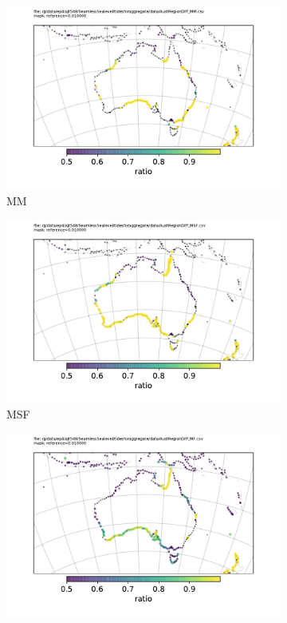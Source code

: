 \begin{figure}[H]
\begin{subfigure}[b]{\figwidthHalf}
    \end{subfigure}
    \begin{subfigure}[b]{\figwidthHalf}
        \includegraphics[width=\textwidth]{figures/maps/AustRegionDiff_MM.pdf}
        \caption{MM}
    \end{subfigure}
    \begin{subfigure}[b]{\figwidthHalf}
        \includegraphics[width=\textwidth]{figures/maps/AustRegionDiff_MSF.pdf}
        \caption{MSF}
    \end{subfigure}
    \begin{subfigure}[b]{\figwidthHalf}
        \includegraphics[width=\textwidth]{figures/maps/AustRegionDiff_MF.pdf}

\end{subfigure}
\end{figure}
